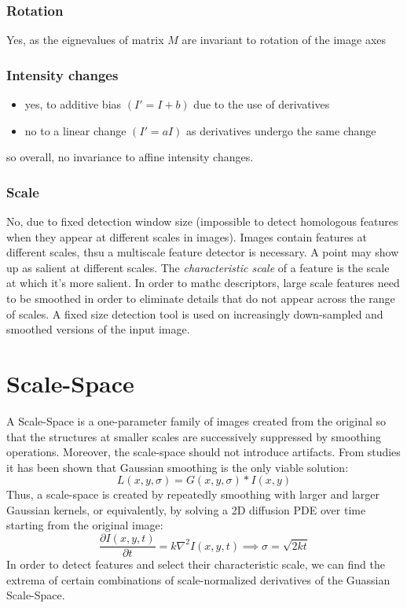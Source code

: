 \documentclass{article}
\begin{document}
\subsubsection{Rotation}
Yes, as the eignevalues of matrix $M$ are invariant to rotation of the image axes
\subsubsection{Intensity changes}
\begin{itemize}
  \item yes, to additive bias $(I'=I+b)$ due to the use of derivatives
    \item no to a linear change $(I' = aI)$ as derivatives undergo the same change
\end{itemize}
so overall, no invariance to affine intensity changes. 
\subsubsection{Scale}
No, due to fixed detection window size (impossible to detect homologous features when they appear at different scales in images). Images contain features at different scales, thsu a multiscale feature detector is necessary. A point may show up as salient at different scales. The \emph{characteristic scale} of a feature is the scale at which it's more salient. In order to mathc descriptors, large scale features need to be smoothed in order to eliminate details that do not appear across the range of scales. A fixed size detection tool is used on increasingly down-sampled and smoothed versions of the input image. 

\section{Scale-Space}
A Scale-Space is a one-parameter family of images created from the original so that the structures at smaller scales are successively suppressed by smoothing operations. Moreover, the scale-space should not introduce artifacts. From studies it has been shown that Gaussian smoothing is the only viable solution: 
\[
  L(x,y,\sigma) = G(x,y,\sigma)\ast I (x,y)
\]
Thus, a scale-space is created by repeatedly smoothing with larger and larger Gaussian kernels, or equivalently, by solving a 2D diffusion PDE over time starting from the original image: 
\[
  \frac{\partial I(x,y,t) }{\partial t} = k\nabla^2I(x,y,t) \implies \sigma=\sqrt{2kt}
\]
In order to detect features and select their characteristic scale, we can find the extrema of certain combinations of scale-normalized derivatives of the Guassian Scale-Space. 
\end{document}
